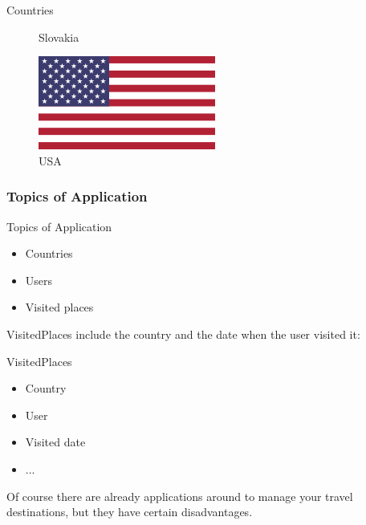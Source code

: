 \begin{frame}{Countries}
\begin{figure}[!ht]
\begin{minipage}{.24\textwidth}
\caption{Slovakia}
\end{minipage}
\begin{minipage}{.24\textwidth}
\centering
\includegraphics[width=0.8\linewidth]{img/countries/usa.png}
\caption{USA}
\end{minipage}

\end{figure}

\end{frame}

\subsubsection{Topics of Application}

\begin{frame}{Topics of Application}
\begin{itemize}
\item Countries
\item Users
\item Visited places
\end{itemize}
\end{frame}

VisitedPlaces include the country and the date when the 
user visited it:

\begin{frame}{VisitedPlaces}
\begin{itemize}
\item Country
\item User
\item Visited date
\item ...
\end{itemize}
\end{frame}

Of course there are already applications around to manage
your travel destinations, but they have certain disadvantages.



